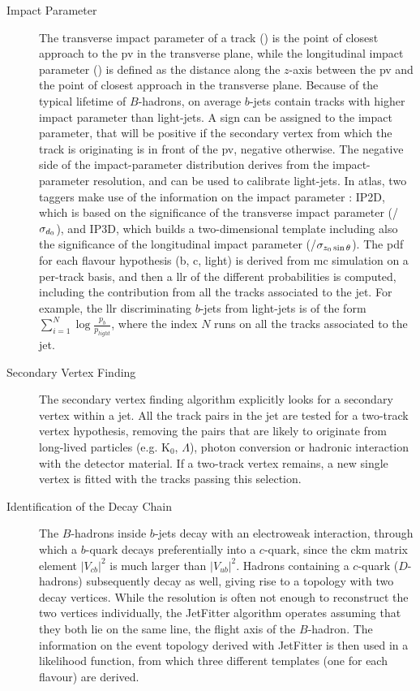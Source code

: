 \begin{description}

\item[Impact Parameter] The transverse impact parameter of a track (\dzero) is the point of closest approach to the 
\gls{pv} in the transverse plane, while the longitudinal impact parameter (\zzerost) is defined as the distance along 
the $z$-axis between the \gls{pv} and the point of closest approach in the transverse plane. Because of the typical 
lifetime of $B$-hadrons, on average $b$-jets contain tracks with higher impact parameter than light-jets. 
A sign can be 
assigned to the impact parameter, that will be positive if the secondary vertex from which the track is originating is 
in front of the \gls{pv}, negative otherwise. The negative side of the impact-parameter distribution derives from the 
impact-parameter resolution, and can be used to calibrate light-jets. In \gls{atlas}, two taggers make use of the information on the impact parameter
 \cite{ATLAS:2011qia}: IP2D, which is based on the significance of the transverse impact parameter (\dzero/$\sigma_{{d_0}}$), and IP3D, which builds a two-dimensional template including also the significance of the longitudinal impact parameter (\zzerost/$\sigma_{{z_0} \sin\theta}$). The \gls{pdf} for each flavour hypothesis (b, c, light) is derived from \gls{mc} simulation on a per-track basis, and then a \gls{llr} of the different probabilities is computed, including the contribution from all the tracks associated to the jet. For example, the \gls{llr} discriminating $b$-jets from light-jets is of the form $\sum_{i=1}^{N}\log\frac{p_b}{p_{light}}$, where the index $N$ runs on all the tracks associated to the jet. 

\item[Secondary Vertex Finding] The secondary vertex finding algorithm \cite{ATLAS:2011qia} explicitly looks for a secondary vertex within a jet. 
All the track pairs in the jet are tested for a two-track vertex hypothesis, removing the pairs that are likely to originate from 
long-lived particles (e.g. K$_0$, $\Lambda$), photon conversion or hadronic interaction with the detector material. 
If a two-track vertex remains, a new single vertex is fitted with the tracks passing this selection.

\item[Identification of the Decay Chain] The $B$-hadrons inside $b$-jets decay with an electroweak interaction, 
through which a $b$-quark decays preferentially into a $c$-quark, since the \gls{ckm} matrix element $|V_{cb}|^2$ is much larger than $|V_{ub}|^2$. Hadrons containing a $c$-quark ($D$-hadrons) subsequently decay as well, giving rise to a topology with two decay vertices. While the resolution is often not enough to reconstruct the two vertices individually, the JetFitter algorithm \cite{1742-6596-119-3-032032} operates assuming that they both lie on the same line, the flight axis of the $B$-hadron. The information on the event topology derived with JetFitter is then used in a likelihood function, from which three different templates (one for each flavour) are derived.

\end{description}

